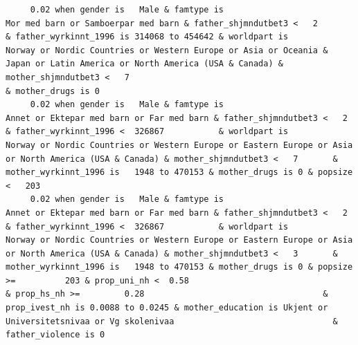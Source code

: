 \documentclass[
  letterpaper,
  DIV=11,
  numbers=noendperiod]{scrreprt}
\begin{document}
\begin{verbatim}
     0.02 when gender is   Male & famtype is                              Mor med barn or Samboerpar med barn & father_shjmndutbet3 <   2       & father_wyrkinnt_1996 is 314068 to 454642 & worldpart is            Norway or Nordic Countries or Western Europe or Asia or Oceania & Japan or Latin America or North America (USA & Canada) & mother_shjmndutbet3 <   7                                                  & mother_drugs is 0                                                                                                                                                                                                                                                                                                                                                                                                                                         
     0.02 when gender is   Male & famtype is                        Annet or Ektepar med barn or Far med barn & father_shjmndutbet3 <   2       & father_wyrkinnt_1996 <  326867           & worldpart is                              Norway or Nordic Countries or Western Europe or Eastern Europe or Asia or North America (USA & Canada) & mother_shjmndutbet3 <   7       & mother_wyrkinnt_1996 is   1948 to 470153 & mother_drugs is 0 & popsize <   203                                                                                                                                                                                                                                                                                                                                                                                                                       
     0.02 when gender is   Male & famtype is                        Annet or Ektepar med barn or Far med barn & father_shjmndutbet3 <   2       & father_wyrkinnt_1996 <  326867           & worldpart is                              Norway or Nordic Countries or Western Europe or Eastern Europe or Asia or North America (USA & Canada) & mother_shjmndutbet3 <   3       & mother_wyrkinnt_1996 is   1948 to 470153 & mother_drugs is 0 & popsize >=          203 & prop_uni_nh <  0.58                                              & prop_hs_nh >=         0.28                                    & prop_ivest_nh is 0.0088 to 0.0245 & mother_education is Ukjent or Universitetsnivaa or Vg skolenivaa                                & father_violence is 0                                                                                                               

\end{verbatim}
\end{document}
